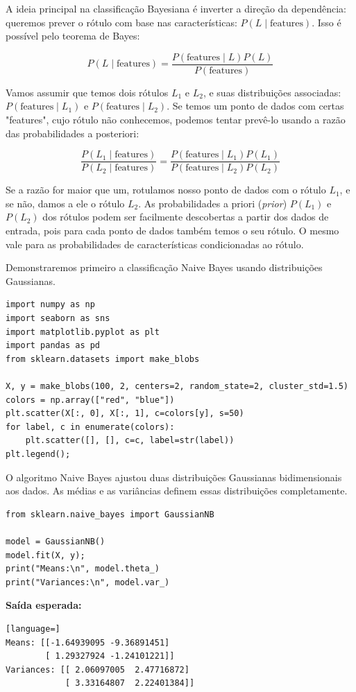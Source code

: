\documentclass[11pt,a4paper]{article}
\begin{document}
A ideia principal na classificação Bayesiana é inverter a direção da dependência: queremos prever o rótulo com base nas características: $P(L \mid \text{features})$. Isso é possível pelo teorema de Bayes:

\[
P(L \mid \text{features}) = \frac{P(\text{features} \mid L)P(L)}{P(\text{features})}
\]

Vamos assumir que temos dois rótulos $L_1$ e $L_2$, e suas distribuições associadas: $P(\text{features} \mid L_1)$ e $P(\text{features} \mid L_2)$. Se temos um ponto de dados com certas "features", cujo rótulo não conhecemos, podemos tentar prevê-lo usando a razão das probabilidades a posteriori:

\[
\frac{P(L_1 \mid \text{features})}{P(L_2 \mid \text{features})} = \frac{P(\text{features} \mid L_1)P(L_1)}{P(\text{features} \mid L_2)P(L_2)}
\]

Se a razão for maior que um, rotulamos nosso ponto de dados com o rótulo $L_1$, e se não, damos a ele o rótulo $L_2$. As probabilidades a priori (\emph{prior}) $P(L_1)$ e $P(L_2)$ dos rótulos podem ser facilmente descobertas a partir dos dados de entrada, pois para cada ponto de dados também temos o seu rótulo. O mesmo vale para as probabilidades de características condicionadas ao rótulo.

Demonstraremos primeiro a classificação Naive Bayes usando distribuições Gaussianas.

\begin{lstlisting}
import numpy as np
import seaborn as sns
import matplotlib.pyplot as plt
import pandas as pd
from sklearn.datasets import make_blobs

X, y = make_blobs(100, 2, centers=2, random_state=2, cluster_std=1.5)
colors = np.array(["red", "blue"])
plt.scatter(X[:, 0], X[:, 1], c=colors[y], s=50)
for label, c in enumerate(colors):
    plt.scatter([], [], c=c, label=str(label))
plt.legend();
\end{lstlisting}

O algoritmo Naive Bayes ajustou duas distribuições Gaussianas bidimensionais aos dados. As médias e as variâncias definem essas distribuições completamente.

\begin{lstlisting}
from sklearn.naive_bayes import GaussianNB

model = GaussianNB()
model.fit(X, y);
print("Means:\n", model.theta_)
print("Variances:\n", model.var_)
\end{lstlisting}

\textbf{Saída esperada:}
\begin{lstlisting}[language=]
Means: [[-1.64939095 -9.36891451]
        [ 1.29327924 -1.24101221]]
Variances: [[ 2.06097005  2.47716872]
            [ 3.33164807  2.22401384]]
\end{lstlisting}
\end{document}

